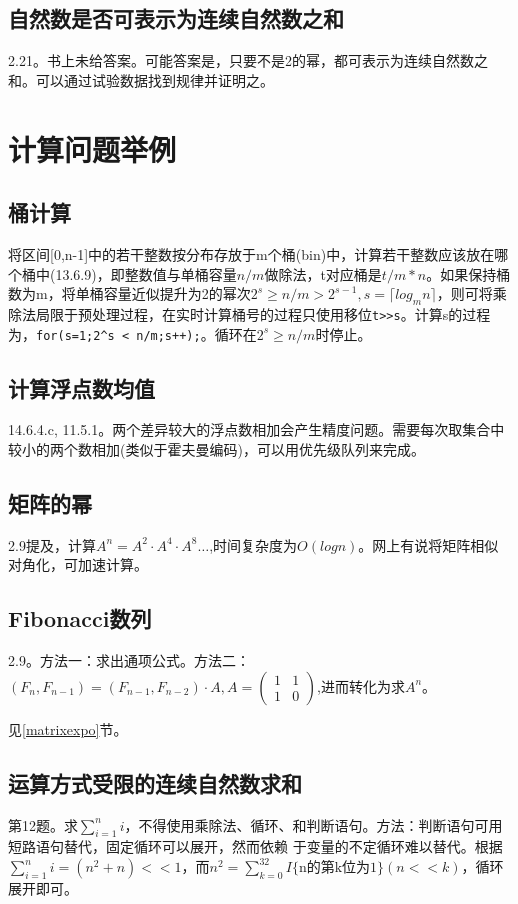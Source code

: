 \subsection{自然数是否可表示为连续自然数之和}
\cite{bop}2.21。书上未给答案。可能答案是，只要不是2的幂，都可表示为连续自然数之和。可以通过试验数据找到规律并证明之。

\section{计算问题举例}

\subsection{桶计算}
将区间[0,n-1]中的若干整数按分布存放于m个桶(bin)中，计算若干整数应该放在哪个桶中(\cite{pp}13.6.9)，即整数值与单桶容量$n/m$做除法，t对应桶是$t/m*n$。如果保持桶数为m，将单桶容量近似提升为2的幂次$2^s \ge n/m > 2^{s-1},s=\lceil log_{m}{n} \rceil$，则可将乘除法局限于预处理过程，在实时计算桶号的过程只使用移位\verb|t>>s|。计算s的过程为，\verb|for(s=1;2^s < n/m;s++);|。循环在$2^s \ge n/m$时停止。

\subsection{计算浮点数均值}
\cite{pp}14.6.4.c, 11.5.1。两个差异较大的浮点数相加会产生精度问题。需要每次取集合中较小的两个数相加(类似于霍夫曼编码)，可以用优先级队列来完成。

\subsection{矩阵的幂}
\cite{bop}2.9提及，计算$A^n=A^{2} \cdot A^{4} \cdot A^{8}\dots$,时间复杂度为$O(logn)$。网上有说将矩阵相似对角化，可加速计算。
\label{matrixexpo}
\subsection{Fibonacci数列}
\cite{bop}2.9。方法一：求出通项公式。方法二：$(F_n,F_{n-1})=(F_{n-1},F_{n-2})\cdot A, A=  \left( \begin{array}{cc}1&1\\1&0\end{array}\right)$,进而转化为求$A^n$。

见\ref{matrixexpo}节。



\subsection{运算方式受限的连续自然数求和}
\cite{ms100}第12题。求$ \sum_{i=1}^{n}i $，不得使用乘除法、循环、和判断语句。方法：判断语句可用短路语句替代，固定循环可以展开，然而依赖
于变量的不定循环难以替代。根据$ \sum_{i=1}^{n}i = (n^{2}+n)<<1$，而$n^{2}=\sum_{k=0}^{32}I\{\textrm{n的第k位为1}\}(n<<k)$，循环展开即可。
